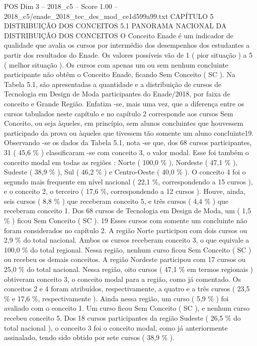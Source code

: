 \begin{textsample}{POS Dim 3 – 2018\_c5 – Score 1.00 – 2018\_c5/enade\_2018\_tec\_des\_mod\_ce1d599a99.txt}  \label{ex:f3_pos_187}
CAPÍTULO 5 DISTRIBUIÇÃO DOS CONCEITOS 5.1 PANORAMA NACIONAL DA DISTRIBUIÇÃO DOS CONCEITOS O Conceito Enade é um indicador de qualidade que avalia os cursos por intermédio dos desempenhos dos estudantes a partir dos resultados do Enade.
Os valores possíveis vão de 1 ( pior situação ) a 5 ( melhor situação ).
Os cursos com apenas um ou sem nenhum concluinte participante não obtêm o Conceito Enade, ficando Sem Conceito ( SC ).
Na Tabela 5.1, são apresentadas a quantidade e a distribuição de cursos de Tecnologia em Design de Moda participantes do Enade/2018, por faixa de conceito e Grande Região.
Enfatiza -se, mais uma vez, que a diferença entre os cursos tabulados neste capítulo e no capítulo 2 corresponde aos cursos Sem Conceito, ou seja àqueles, em princípio, sem alunos concluintes que houvessem participado da prova ou àqueles que tivessem tão somente um aluno concluinte19.
Observando -se os dados da Tabela 5.1, nota -se que, dos 68 cursos participantes, 31 ( 45,6 \% ) classificaram -se com conceito 3, o valor modal.
Esse foi também o conceito modal em todas as regiões : Norte ( 100,0 \% ), Nordeste ( 47,1 \% ), Sudeste ( 38,9 \% ), Sul ( 46,2 \% ) e Centro-Oeste ( 40,0 \% ).
O conceito 4 foi o segundo mais frequente em nível nacional ( 22,1 \%, correspondendo a 15 cursos ), e o conceito 2, o terceiro ( 17,6 \%, correspondendo a 12 cursos ).
Houve, ainda, seis cursos ( 8,8 \% ) que receberam conceito 5, e três cursos ( 4,4 \% ) que receberam conceito 1.
Dos 68 cursos de Tecnologia em Design de Moda, um ( 1,5 \% ) ficou Sem Conceito ( SC ). 19 Esses cursos com somente um concluinte não foram considerados no capítulo 2.
A região Norte participou com dois cursos ou 2,9 \% do total nacional.
Ambos os cursos receberam conceito 3, o que equivale a 100,0 \% do total regional.
Nessa região, nenhum curso ficou Sem Conceito ( SC ) ou recebeu os demais conceitos.
A região Nordeste participou com 17 cursos ou 25,0 \% do total nacional.
Nessa região, oito cursos ( 47,1 \% em termos regionais ) obtiveram conceito 3, o conceito modal para a região, como já comentado.
Os conceitos 2 e 4 foram atribuídos, respectivamente, a quatro e a três cursos ( 23,5 \% e 17,6 \%, respectivamente ).
Ainda nessa região, um curso ( 5,9 \% ) foi avaliado com o conceito 1.
Um curso ficou Sem Conceito ( SC ), e nenhum curso recebeu conceito 5.
Dos 18 cursos participantes da região Sudeste ( 26,5 \% do total nacional ), o conceito 3 foi o conceito modal, como já anteriormente assinalado, tendo sido obtido por sete cursos ( 38,9 \% ).

\end{textsample}
